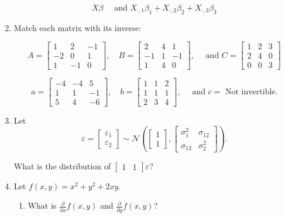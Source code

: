\documentclass[12pt]{article}
\begin{document}
\begin{enumerate}
  $$
    X \beta \quad \text{ and }
    X_{\cdot, 1} \beta_1 + X_{\cdot, 2} \beta_2 + X_{\cdot, 3} \beta_3
  $$


  \newpage
  \item Match each matrix with its inverse:

  $$
    A = \begin{bmatrix} 1 & 2 & -1 \\ -2 & 0 & 1 \\ 1 & -1 & 0 \end{bmatrix},
    \quad
    B = \begin{bmatrix} 2 & 4 & 1 \\ -1 & 1 & -1 \\ 1 & 4 & 0 \end{bmatrix},
    \quad \text{ and }
    C = \begin{bmatrix}  1 & 2 & 3 \\ 2 & 4 & 0 \\ 0 & 0 & 3 \end{bmatrix}
  $$

  $$
    a = \begin{bmatrix} -4 & -4 & 5 \\ 1 & 1 & -1 \\ 5 & 4 & -6 \end{bmatrix},
    \quad
    b = \begin{bmatrix} 1 & 1 & 2 \\ 1 & 1 & 1 \\ 2 & 3 & 4\end{bmatrix},
    \quad \text{ and }
    c = \text{ Not invertible}.
  $$


  \bigskip\bigskip
  \item Let $$
    \varepsilon = \begin{bmatrix}\varepsilon_1 \\ \varepsilon_2\end{bmatrix} \sim \mathcal{N}\left( \begin{bmatrix}1 \\ 1\end{bmatrix}, \begin{bmatrix}\sigma_1^2 & \sigma_{12} \\ \sigma_{12} & \sigma_2^2\end{bmatrix} \right).
  $$

  What is the distribution of $\begin{bmatrix} 1 & 1 \end{bmatrix} \varepsilon$?

  \bigskip\bigskip
  \item Let $f(x, y) = x^2 + y^2 + 2xy$.
  \begin{enumerate}
    \item What is $\frac{\partial}{\partial x} f(x,y)$ and $\frac{\partial}{\partial y} f(x,y)$?


\end{enumerate}
\end{enumerate}
\end{document}
